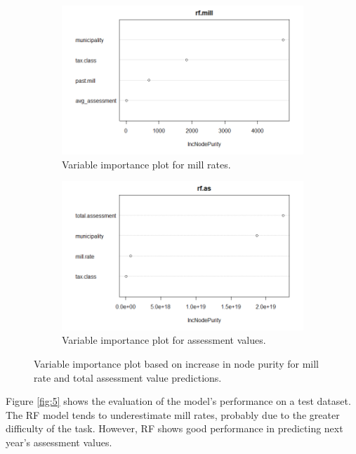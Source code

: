 \documentclass{article}
\begin{document}
\begin{figure}[ht]
\centering
\begin{subfigure}{.5\textwidth}
  \centering
  \includegraphics[width=.9\textwidth]{figures/nodepur.png}
  \caption{Variable importance plot for mill rates.}
  \label{fig:4a}
\end{subfigure}%
\begin{subfigure}{.5\textwidth}
  \centering
  \includegraphics[width=.9\textwidth]{figures/asnodepur.png}
  \caption{Variable importance plot for assessment values.}
  \label{fig:4b}
\end{subfigure}
\caption{Variable importance plot based on increase in node purity for mill rate and total assessment value predictions.}
\label{fig:4}
\end{figure}

Figure \ref{fig:5} shows the evaluation of the model's performance on a test dataset. The RF model tends to underestimate mill rates, probably due to the greater difficulty of the task. However, RF shows good performance in predicting next year's assessment values.
\end{document}
